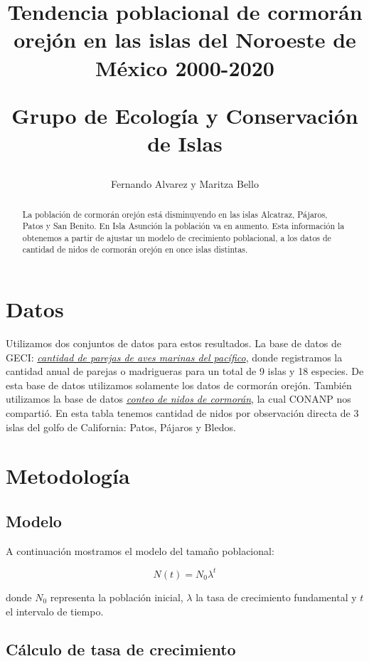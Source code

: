 \documentclass{article} %
\author{Fernando Alvarez y Maritza Bello}
\title{Tendencia poblacional de cormorán orejón en las islas del Noroeste de México 2000-2020\\ \begin{large} Grupo de Ecología y Conservación de Islas \end{large}}
\begin{document}
\maketitle

\begin{abstract}
La población de cormorán orejón está disminuyendo en las islas Alcatraz, Pájaros, Patos y San Benito. En Isla Asunción la población va en aumento. Esta información la obtenemos a partir de ajustar un modelo de crecimiento poblacional, a los datos de cantidad de nidos de cormorán orejón en once islas distintas.

\end{abstract}

\section*{Datos}

Utilizamos dos conjuntos de datos para estos resultados. La base de datos de GECI: \href{https://drive.google.com/drive/u/0/folders/1K2-itQXbNXPhrz4Pb3eRr9NG9A4rR47o}{{\color{blue}\textit{cantidad de parejas de aves marinas del pacífico}}}, donde registramos la cantidad anual de parejas o madrigueras para un total de 9 islas y 18 especies. De esta base de datos utilizamos solamente los datos de cormorán orejón. También utilizamos la base de datos \href{https://drive.google.com/drive/folders/1aXmotwcGcZjK52USWMdlZoffaMUlI0tT}{{\color{blue}\textit{\underline{conteo de nidos de cormorán}}}}, la cual CONANP nos compartió. En esta tabla tenemos cantidad de nidos por observación directa de 3 islas del golfo de California: Patos, Pájaros y Bledos.


\section*{Metodología}
\subsection*{Modelo}
A continuación mostramos el modelo del tamaño poblacional:

\begin{equation}
N(t)=N_{0}\lambda^{t}
\end{equation}

\noindent donde $N_{0}$ representa la población inicial, $\lambda$ la tasa de crecimiento fundamental y $t$ el intervalo de tiempo. 

\subsection*{Cálculo de tasa de crecimiento}
\end{document}

